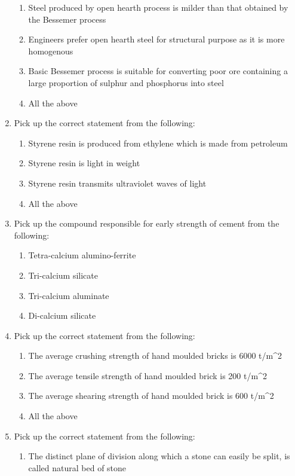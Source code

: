 \documentclass[11pt,a4paper]{article}
\begin{document}
\begin{enumerate}
\begin{enumerate}[label=\Alph*.]
\item{Steel produced by open hearth process is milder than that obtained by the Bessemer process}
\item{Engineers prefer open hearth steel for structural purpose as it is more homogenous}
\item{Basic Bessemer process is suitable for converting poor ore containing a large proportion of sulphur and phosphorus into steel}
\item{All the above}
\end{enumerate}
\item{Pick up the correct statement from the following:}
\begin{enumerate}[label=\Alph*.]
\item{Styrene resin is produced from ethylene which is made from petroleum}
\item{Styrene resin is light in weight}
\item{Styrene resin transmits ultraviolet waves of light}
\item{All the above}
\end{enumerate}
\item{Pick up the compound responsible for early strength of cement from the following:}
\begin{enumerate}[label=\Alph*.]
\item{Tetra-calcium alumino-ferrite}
\item{Tri-calcium silicate}
\item{Tri-calcium aluminate}
\item{Di-calcium silicate}
\end{enumerate}
\item{Pick up the correct statement from the following:}
\begin{enumerate}[label=\Alph*.]
\item{The average crushing strength of hand moulded bricks is 6000 t/m\^{}2}
\item{The average tensile strength of hand moulded brick is 200 t/m\^{}2}
\item{The average shearing strength of hand moulded brick is 600 t/m\^{}2}
\item{All the above}
\end{enumerate}
\item{Pick up the correct statement from the following:}
\begin{enumerate}[label=\Alph*.]
\item{The distinct plane of division along which a stone can easily be split, is called natural bed of stone}

\end{enumerate}
\end{enumerate}
\end{document}
